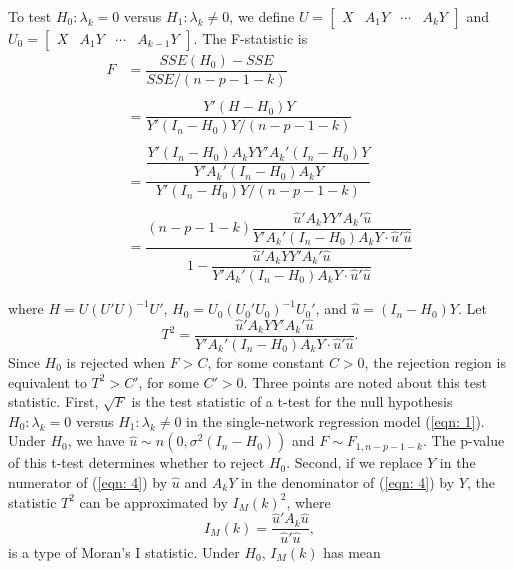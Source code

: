 \documentclass[times, doublespace]{auth}
\begin{document}
\noindent To test $H_{0}: \lambda_{k} = 0$ versus $H_{1}: \lambda_{k} \ne 0$, we define $U = \begin{bmatrix} X & A_{1}Y & \cdots & A_{k}Y\end{bmatrix}$ and $U_{0} = \begin{bmatrix} X & A_{1}Y & \cdots & A_{k-1}Y\end{bmatrix}$. The F-statistic is
\newline
\[
\begin{array}{rl}
F &= \dfrac{SSE(H_{0}) - SSE}{SSE/(n-p-1-k)}\\
\\
&= \dfrac{Y'(H-H_{0})Y}{Y'(I_{n} - H_{0})Y/(n-p-1-k)}\\
\\
&= \dfrac{\dfrac{Y'(I_{n} - H_{0})A_{k}YY'A_{k}'(I_{n}-H_{0})Y}{Y'A_{k}'(I_{n}-H_{0})A_{k}Y}}{Y'(I_{n} - H_{0})Y/(n-p-1-k)}\\
\\
&= \dfrac{(n-p-1-k)\dfrac{\hat{u}'A_{k}YY'A_{k}'\hat{u}}{Y'A_{k}'(I_{n}-H_{0})A_{k}Y \cdot \hat{u}'\hat{u}}}{1-\dfrac{\hat{u}'A_{k}YY'A_{k}'\hat{u}}{Y'A_{k}'(I_{n}-H_{0})A_{k}Y \cdot \hat{u}'\hat{u}}}\\
\\
\end{array}
\]
where $H = U(U'U)^{-1}U'$, $H_{0} = U_{0}(U_{0}'U_{0})^{-1}U_{0}'$, and $\hat{u} = (I_{n} - H_{0})Y$. Let 
\begin{equation}
\label{eqn: 4}
T^{2} = \dfrac{\hat{u}'A_{k}YY'A_{k}'\hat{u}}{Y'A_{k}'(I_{n}-H_{0})A_{k}Y \cdot \hat{u}'\hat{u}}.
\end{equation}
Since $H_{0}$ is rejected when $F > C$, for some constant $C > 0$, the rejection region is equivalent to $T^{2} > C'$, for some $C' > 0$. Three points are noted about this test statistic. First, $\sqrt{F}$ is the test statistic of a t-test for the null hypothesis $H_{0}: \lambda_{k} = 0$ versus $H_{1}: \lambda_{k} \ne 0$ in the single-network regression model (\ref{eqn: 1}). Under $H_{0}$, we have $\hat{u} \sim n(0, \sigma^{2}(I_{n} - H_{0}))$ and $F \sim F_{1,n-p-1-k}$. The p-value of this t-test determines whether to reject $H_{0}$. Second, if we replace $Y$ in the numerator of (\ref{eqn: 4}) by $\hat{u}$ and $A_{k}Y$ in the denominator of (\ref{eqn: 4}) by $Y$, the statistic $T^{2}$ can be approximated by $I_{M}(k)^{2}$, where  
\begin{equation}
\label{eqn: 5}
I_{M}(k) = \dfrac{\hat{u}'A_{k}\hat{u}}{\hat{u}'\hat{u}},
\end{equation}
is a type of Moran's I statistic. Under $H_{0}$, $I_{M}(k)$ has mean 
\end{document}
